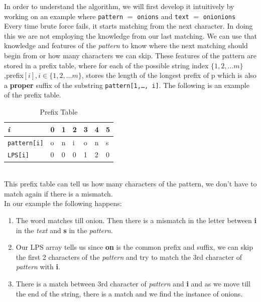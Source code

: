 \documentclass[a4paper, 12pt]{report}
\begin{document}
    In order to understand the algorithm, we will first develop it intuitively by working on an example where \texttt{pattern} $=$ \texttt{onions} and \texttt{text} $=$ \texttt{onionions}
    \\
    Every time brute force fails, it starts matching from the next character. In doing this we are not employing the knowledge from our last matching. We can use that knowledge and features of the \textit{pattern} to know where the next matching should begin from or how many characters we can skip.
    These features of the pattern are stored in a prefix table, where for each of the possible string index \(\{1,2,\dots m\}\) ,prefix\([i], i \in \{1,2,\dots m\}\), stores the length of the longest prefix of p which is also a \textbf{proper} suffix of the substring \texttt{pattern[1,\dots, i]}.
    The following is an example of the prefix table.
    \begin{table}[h]
        \centering
        \begin{tabular}{l|l|l|l|l|l|l|}
        \cline{2-7}
        \textit{i}     & 0 & 1 & 2 & 3 & 4 & 5  \\ \hline
        \texttt{pattern[i]} & o & n & i & o & n & s \\ \hline
        \texttt{LPS[i]}     & 0 & 0 & 0 & 1 & 2 & 0 \\ \hline
        \end{tabular}
        \caption{Prefix Table}
        \label{tab:Prefixtable}
        \end{table}  
        \\
    This prefix table can tell us how many characters of the pattern, we don't have to match again if there is a mismatch. \\
    In our example the following happens:
    \begin{enumerate}
        \item The word matches till onion. Then there is a mismatch in the letter between \textbf{i} in the \textit{text} and \textbf{s} in the \textit{pattern}. 
        \item Our LPS array tells us since \textbf{on} is the common prefix and suffix, we can skip the first 2 characters of the \textit{pattern} and try to match the 3rd character of \textit{pattern} with \textbf{i}.
        \item There is a match between 3rd character of \textit{pattern} and \textbf{i} and as we move till the end of the string, there is a match and we find the instance of onions. 
    \end{enumerate}
    
\end{document}
